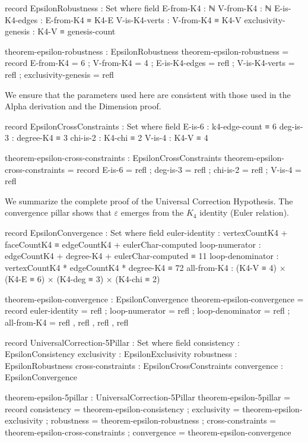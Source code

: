 \documentclass[11pt,a4paper]{book}
\begin{document}
\begin{code}
record EpsilonRobustness : Set where
  field
    E-from-K4     : ℕ
    V-from-K4     : ℕ
    E-is-K4-edges : E-from-K4 ≡ K4-E
    V-is-K4-verts : V-from-K4 ≡ K4-V
    exclusivity-genesis : K4-V ≡ genesis-count

theorem-epsilon-robustness : EpsilonRobustness
theorem-epsilon-robustness = record
  { E-from-K4 = 6
  ; V-from-K4 = 4
  ; E-is-K4-edges = refl
  ; V-is-K4-verts = refl
  ; exclusivity-genesis = refl
  }
\end{code}

We ensure that the parameters used here are consistent with those used in the Alpha derivation and the Dimension proof.

\begin{code}
record EpsilonCrossConstraints : Set where
  field
    E-is-6 : k4-edge-count ≡ 6
    deg-is-3 : degree-K4 ≡ 3
    chi-is-2 : K4-chi ≡ 2
    V-is-4 : K4-V ≡ 4

theorem-epsilon-cross-constraints : EpsilonCrossConstraints
theorem-epsilon-cross-constraints = record
  { E-is-6 = refl
  ; deg-is-3 = refl
  ; chi-is-2 = refl
  ; V-is-4 = refl
  }
\end{code}

We summarize the complete proof of the Universal Correction Hypothesis.
The convergence pillar shows that $\varepsilon$ emerges from the $K_4$ identity (Euler relation).

\begin{code}
record EpsilonConvergence : Set where
  field
    euler-identity : vertexCountK4 + faceCountK4 ≡ edgeCountK4 + eulerChar-computed
    loop-numerator : edgeCountK4 + degree-K4 + eulerChar-computed ≡ 11
    loop-denominator : vertexCountK4 * edgeCountK4 * degree-K4 ≡ 72
    all-from-K4 : (K4-V ≡ 4) × (K4-E ≡ 6) × (K4-deg ≡ 3) × (K4-chi ≡ 2)

theorem-epsilon-convergence : EpsilonConvergence
theorem-epsilon-convergence = record
  { euler-identity = refl
  ; loop-numerator = refl
  ; loop-denominator = refl
  ; all-from-K4 = refl , refl , refl , refl
  }

record UniversalCorrection-5Pillar : Set where
  field
    consistency : EpsilonConsistency
    exclusivity : EpsilonExclusivity
    robustness : EpsilonRobustness
    cross-constraints : EpsilonCrossConstraints
    convergence : EpsilonConvergence

theorem-epsilon-5pillar : UniversalCorrection-5Pillar
theorem-epsilon-5pillar = record
  { consistency = theorem-epsilon-consistency
  ; exclusivity = theorem-epsilon-exclusivity
  ; robustness = theorem-epsilon-robustness
  ; cross-constraints = theorem-epsilon-cross-constraints
  ; convergence = theorem-epsilon-convergence
  }
\end{code}
\end{document}
